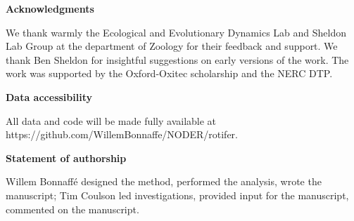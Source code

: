 \documentclass[11pt, oneside]{article}
\begin{document}
\textbf{Acknowledgments}

We thank warmly the Ecological and Evolutionary Dynamics Lab and Sheldon Lab Group at the department of Zoology for their feedback and support.
We thank Ben Sheldon for insightful suggestions on early versions of the work.
The work was supported by the Oxford-Oxitec scholarship and the NERC DTP.

\textbf{Data accessibility}

All data and code will be made fully available at https://github.com/WillemBonnaffe/NODER/rotifer.

\textbf{Statement of authorship}

Willem Bonnaff\'e designed the method, performed the analysis, wrote the manuscript; 
Tim Coulson led investigations, provided input for the manuscript, commented on the manuscript.

\printbibliography 

\newpage
{}
\end{document}
